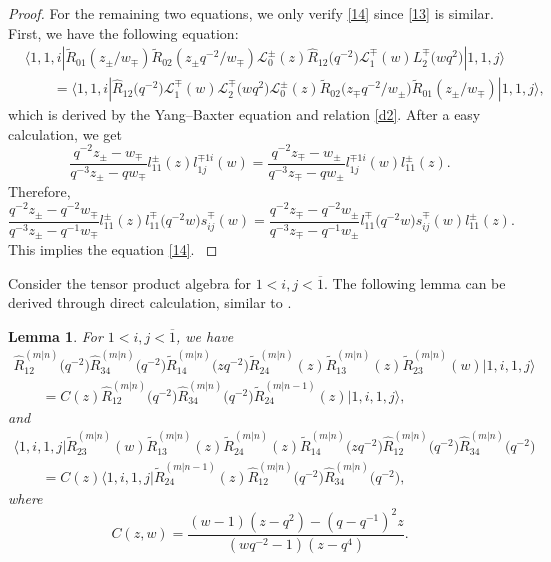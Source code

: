 \documentclass[10pt,a4paper]{amsart}
\numberwithin{equation}{section}
\newtheorem{Lemma}[Theorem]{Lemma}
\begin{document}
\begin{proof}
For the remaining two equations, we only verify \eqref{14} since \eqref{13} is similar.
First, we have the following equation:
\begin{align*}
 &\big\langle 1, 1, i|\widetilde{R}_{01}(z_{\pm}/w_{\mp})\widetilde{R}_{02}(z_{\pm}q^{-2}/w_{\mp})\mathcal{L}_0^{\pm}(z)\widehat{R}_{12}\bigl(q^{-2}\bigr)\mathcal{L}_1^{\mp}(w)L_2^{\mp}\bigl(wq^2\bigr)|1, 1, j\big\rangle\\
 &\qquad=\big\langle 1, 1, i|\widehat{R}_{12}\bigl(q^{-2}\bigr)\mathcal{L}_1^{\mp}(w)\mathcal{L}_2^{\mp}\bigl(wq^2\bigr)\mathcal{L}_0^{\pm}(z)\widetilde{R}_{02}\bigl(z_{\mp}q^{-2}/w_{\pm}\bigr)\widetilde{R}_{01}(z_{\pm}/w_{\mp})|1, 1, j\big\rangle,
\end{align*}
which is derived by the Yang--Baxter equation and relation \eqref{d2}. After a easy calculation, we get
\begin{equation*}
 \frac{q^{-2}z_{\pm}-w_{\mp}}{q^{-3}z_{\pm}-qw_{\mp}}l_{11}^{\pm}(z)l^{\mp 1i}_{1j}(w)=\frac{q^{-2}z_{\mp}-w_{\pm}}{q^{-3}z_{\mp}-qw_{\pm}}l^{\mp 1i}_{1j}(w)l_{11}^{\pm}(z).
\end{equation*}{Therefore,
\begin{equation*}
 \frac{q^{-2}z_{\pm}-q^{-2}w_{\mp}}{q^{-3}z_{\pm}-q^{-1}w_{\mp}}l_{11}^{\pm}(z)l_{11}^{\mp}\bigl(q^{-2}w\bigr)s^{\mp }_{ij}(w)=\frac{q^{-2}z_{\mp}-q^{-2}w_{\pm}}{q^{-3}z_{\mp}-q^{-1}w_{\pm}}l_{11}^{\mp}\bigl(q^{-2}w\bigr)s^{\mp }_{ij}(w)l_{11}^{\pm}(z).
\end{equation*}This implies the equation \eqref{14}. }
\end{proof}

Consider the tensor product algebra  for $1 < i, j < \overline{1}$.
The following lemma can be derived through direct calculation, similar to \cite[equations (3.25)--(3.31)]{JMA}.

\begin{Lemma}\label{le2}
For $1<i,j <\overline{1}$, we have
\begin{gather*}
 \widehat{R}_{12}^{(m|n)}\bigl(q^{-2}\bigr)\widehat{R}_{34}^{(m|n)}\bigl(q^{-2 }\bigr)\widetilde{R}_{14}^{(m|n)}\bigl(zq^{-2}\bigr)\widetilde{R}_{24}^{(m|n)}(z)\widetilde{R}_{13}^{(m|n)}(z)\widetilde{R}_{23}^{(m|n)}(w)|1, i, 1, j\rangle \nonumber\\
 \qquad=C(z)\widehat{R}_{12}^{(m|n)}\bigl(q^{-2}\bigr)\widehat{R}_{34}^{(m|n)}\bigl(q^{-2}\bigr)\widetilde{R}_{24}^{(m|n-1)}(z)|1,i, 1, j\rangle,
 \end{gather*}
 and
 \begin{gather*}
 \langle1, i, 1, j|\widetilde{R}_{23}^{(m|n)}(w)\widetilde{R}_{13}^{(m|n)}(z)\widetilde{R}_{24}^{(m|n)}(z)\widetilde{R}_{14}^{(m|n)}\bigl(zq^{-2}\bigr)\widehat{R}_{12}^{(m|n)}
 \bigl(q^{-2}\bigr)\widehat{R}_{34}^{(m|n)}\bigl(q^{-2}\bigr)\nonumber\\
 \qquad=C(z)\langle1, i, 1, j|\widetilde{R}_{24}^{(m|n-1)}(z)\widehat{R}_{12}^{(m|n)}\bigl(q^{-2}\bigr)\widehat{R}_{34}^{(m|n)}\bigl(q^{-2}\bigr),
\end{gather*}
where
\[C(z,w)
=\frac{(w-1)(z-q^{2})-(q-q^{-1})^2z}{(wq^{-2}-1)(z-q^4)}.
\]
\end{Lemma}
\end{document}
